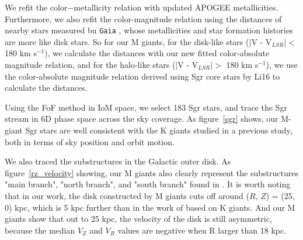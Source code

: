 \documentclass[manuscript]{aastex62}
\newcommand{\gaia}{\texttt{Gaia}}
\begin{document}
\begin{CJK*}{UTF8}{gbsn}
We refit the color$-$metallicity relation with updated APOGEE metallicities. Furthermore, we also refit the color-magnitude relation using the distances of nearby stars measured bu \gaia{} \citep{2021AJ....161...147B}, whose metallicities and star formation histories are more like disk stars. So for our M giants,
for the disk-like stars ($\mid$V - V$_{LSR} \mid <$ 180 km s$^{-1}$), we calculate the distances with our new fitted color-absolute magnitude relation, and for the halo-like stars ($\mid$V - V$_{LSR} \mid  >$ 180 km s$^{-1}$), we use the color-absolute magnitude relation derived using Sgr core stars by Li16 to calculate the distances.

Using the FoF method in IoM space, we select 183 Sgr stars, and trace the Sgr stream in 6D phase space across the sky coverage. As figure~\ref{sgr} shows, our M-giant Sgr stars are well consistent with the K giants studied in a previous study, both in terms of sky position and orbit motion.

We also traced the substructures in the Galactic outer disk. As figure~\ref{rz_velocity} showing, our M giants also clearly represent the substructures "main branch", "north branch", and "south branch" found in \citet{2020ApJ...905....6X}. It is worth noting that in our work, the disk constructed by M giants cuts off around ($R$, $Z$) = (25, 0) kpc, which is 5 kpc further than in the work of \citet{2020ApJ...905....6X} based on K giants. And our M giants show that out to 25 kpc, the velocity of the disk is still asymmetric, because the median $V_{Z}$ and $V_{R}$ values are negative when R larger than 18 kpc. 





\end{CJK*}
\end{document}
